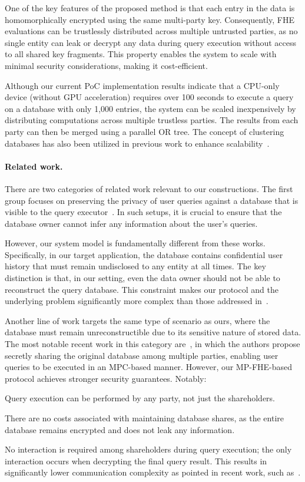 {One of the key features of the proposed method is that each entry in the data is homomorphically encrypted using the same multi-party key. Consequently, FHE evaluations can be trustlessly distributed across multiple untrusted parties, as no single entity can leak or decrypt any data during query execution without access to all shared key fragments. This property enables the system to scale with minimal security considerations, making it cost-efficient. 

Although our current PoC implementation results indicate that a CPU-only device (without GPU acceleration) requires over 100 seconds to execute a query on a database with only 1,000 entries, the system can be scaled inexpensively by distributing computations across multiple trustless parties. The results from each party can then be merged using a parallel OR tree. The concept of clustering databases has also been utilized in previous work to enhance scalability~\cite{wally-search}.

\paragraph{\textbf{Related work.}} 
There are two categories of related work relevant to our constructions. The first group focuses on preserving the privacy of user queries against a database that is visible to the query executor~\cite{wally-search, tiptoe}. In such setups, it is crucial to ensure that the database owner cannot infer any information about the user's queries.

However, our system model is fundamentally different from these works. Specifically, in our target application, the database contains confidential user history that must remain undisclosed to any entity at all times. The key distinction is that, in our setting, even the data owner should not be able to reconstruct the query database. This constraint makes our protocol and the underlying problem significantly more complex than those addressed in~\cite{tiptoe, wally-search}.

Another line of work targets the same type of scenario as ours, where the database must remain unreconstructible due to its sensitive nature of stored data. The most notable recent work in this category are~\cite{iris-search, li2024panther}, in which the authors propose secretly sharing the original database among multiple parties, enabling user queries to be executed in an MPC-based manner. However, our MP-FHE-based protocol achieves stronger security guarantees. Notably:
\begin{compactitem}
    \item Query execution can be performed by any party, not just the shareholders.
    \item There are no costs associated with maintaining database shares, as the entire database remains encrypted and does not leak any information.
    \item No interaction is required among shareholders during query execution; the only interaction occurs when decrypting the final query result. This results in significantly lower communication complexity as pointed in recent work, such as~\cite{li2024panther}.
\end{compactitem}

}

